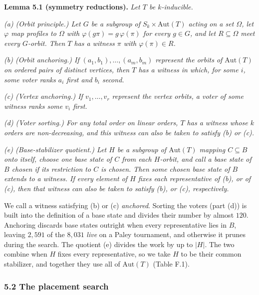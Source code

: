 \documentclass[
]{article}
\begin{document}
\textbf{Lemma 5.1 (symmetry reductions).} \emph{Let \(T\) be
\(k\)-inducible.}

\emph{(a) (Orbit principle.) Let \(G\) be a subgroup of
\(S_k \times \mathrm{Aut}(T)\) acting on a set \(\Omega\), let
\(\varphi\) map profiles to \(\Omega\) with
\(\varphi(g\pi) = g\,\varphi(\pi)\) for every \(g \in G\), and let
\(R \subseteq \Omega\) meet every \(G\)-orbit. Then \(T\) has a witness
\(\pi\) with \(\varphi(\pi) \in R\).}

\emph{(b) (Orbit anchoring.) If \((a_1, b_1), \dots, (a_m, b_m)\)
represent the orbits of \(\mathrm{Aut}(T)\) on ordered pairs of distinct
vertices, then \(T\) has a witness in which, for some \(i\), some voter
ranks \(a_i\) first and \(b_i\) second.}

\emph{(c) (Vertex anchoring.) If \(v_1, \dots, v_r\) represent the
vertex orbits, a voter of some witness ranks some \(v_i\) first.}

\emph{(d) (Voter sorting.) For any total order on linear orders, \(T\)
has a witness whose \(k\) orders are non-decreasing, and this witness
can also be taken to satisfy (b) or (c).}

\emph{(e) (Base-stabilizer quotient.) Let \(H\) be a subgroup of
\(\mathrm{Aut}(T)\) mapping \(C \subseteq B\) onto itself, choose one
base state of \(C\) from each \(H\)-orbit, and call a base state of
\(B\) chosen if its restriction to \(C\) is chosen. Then some chosen
base state of \(B\) extends to a witness. If every element of \(H\)
fixes each representative of (b), or of (c), then that witness can also
be taken to satisfy (b), or (c), respectively.}

We call a witness satisfying (b) or (c) \emph{anchored}. Sorting the
voters (part (d)) is built into the definition of a base state and
divides their number by almost \(120\). Anchoring discards base states
outright when every representative lies in \(B\), leaving \(2{,}591\) of
the \(8{,}031\) \emph{live} on a Paley tournament, and otherwise it
prunes during the search. The quotient (e) divides the work by up to
\(|H|\). The two combine when \(H\) fixes every representative, so we
take \(H\) to be their common stabilizer, and together they use all of
\(\mathrm{Aut}(T)\) (Table F.1).

\subsubsection{5.2 The placement search}\label{the-placement-search}
\end{document}
